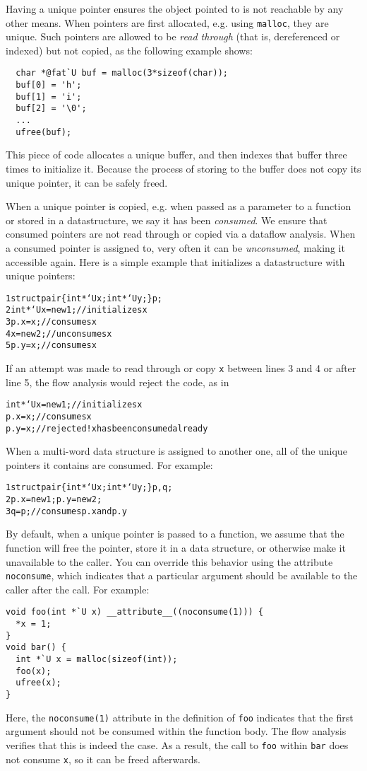 Having a unique pointer ensures the object pointed to is not reachable by
any other means.  When pointers are first allocated, e.g. using
\texttt{malloc}, they are unique.  Such pointers are allowed to be
\emph{read through} (that is, dereferenced or indexed) but not copied, as
the following example shows:
\begin{verbatim}
  char *@fat`U buf = malloc(3*sizeof(char));
  buf[0] = 'h';
  buf[1] = 'i';
  buf[2] = '\0';
  ...
  ufree(buf);
\end{verbatim}
This piece of code allocates a unique buffer, and then indexes that buffer
three times to initialize it.  Because the process of storing to the
buffer does not copy its unique pointer, it can be safely freed.

When a unique pointer is copied, e.g. when passed as a parameter to a
function or stored in a datastructure, we say it has been \emph{consumed}.
We ensure that consumed pointers are not read through or copied via a
dataflow analysis.  When a consumed pointer is assigned to, very often it
can be \emph{unconsumed}, making it accessible again.  Here is a simple
example that initializes a datastructure with unique pointers:
\begin{alltt}
{\small 1}  struct pair \{ int *`U x; int *`U y; \} p;
{\small 2}  int *`U x = new 1;  // initializes x
{\small 3}  p.x = x;            // consumes x
{\small 4}  x = new 2;          // unconsumes x
{\small 5}  p.y = x;            // consumes x
\end{alltt}
If an attempt was made to read through or copy \texttt{x} between lines 3
and 4 or after line 5, the flow analysis would reject the code, as in
\begin{alltt}
  int *`U x = new 1;  // initializes x
  p.x = x;            // consumes x
  p.y = x;            // rejected! x has been consumed already
\end{alltt}
When a multi-word data structure is assigned to another one, all of the
unique pointers it contains are consumed.  For example:
\begin{alltt}
{\small 1}  struct pair \{ int *`U x; int *`U y; \} p, q;
{\small 2}  p.x = new 1; p.y = new 2;
{\small 3}  q = p;              // consumes p.x and p.y
\end{alltt}

By default, when a unique pointer is passed to a function, we assume that the
function will free the pointer, store it in a data structure, or otherwise
make it unavailable to the caller.  You can override this behavior using the
attribute \texttt{noconsume}, which indicates that a particular argument
should be available to the caller after the call.  For example:
\begin{verbatim}
void foo(int *`U x) __attribute__((noconsume(1))) {
  *x = 1;
}
void bar() {
  int *`U x = malloc(sizeof(int));
  foo(x);
  ufree(x);
}
\end{verbatim}
Here, the \texttt{noconsume(1)} attribute in the definition of \texttt{foo}
indicates that the first argument should not be consumed within the function
body.  The flow analysis verifies that this is indeed the case.  As a
result, the call to \texttt{foo} within \texttt{bar} does not consume
\texttt{x}, so it can be freed afterwards.

